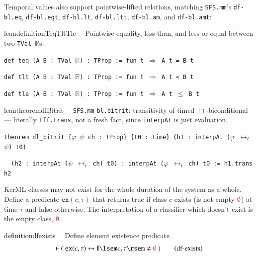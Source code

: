 \pn Temporal values also support pointwise-lifted relations, matching \texttt{SFS.mm}'s \texttt{df-bl.eq}, \texttt{df-bl.eqt}, \texttt{df-bl.lt}, 
\texttt{df-bl.ltt}, \texttt{df-bl.am}, and \texttt{df-bl.amt}:

\begin{restatable}{leandefinition}{TeqTltTle}~~ Pointwise equality, less-than, and less-or-equal between two \texttt{TVal $\mathbb{R}$}s.

\texttt{\textcolor{leancolor}{def} \textcolor{leanyellow}{teq} (A B : TVal $\mathbb{R}$) : TProp := \textcolor{leancolor}{fun} t $\Rightarrow$ A t = B t}

\texttt{\textcolor{leancolor}{def} \textcolor{leanyellow}{tlt} (A B : TVal $\mathbb{R}$) : TProp := \textcolor{leancolor}{fun} t $\Rightarrow$ A t < B t}

\texttt{\textcolor{leancolor}{def} \textcolor{leanyellow}{tle} (A B : TVal $\mathbb{R}$) : TProp := \textcolor{leancolor}{fun} t $\Rightarrow$ A t $\le$ B t}
\label{teq}
\label{tlt}
\label{tle}
\end{restatable}

\begin{restatable}{leantheorem}{dlBitrit}~~ \texttt{SFS.mm} \texttt{bl.bitrit}: transitivity of timed $\Box$-biconditional --- literally \texttt{Iff.trans}, not a fresh fact, since \texttt{interpAt} is just evaluation.

\texttt{\textcolor{leancolor}{theorem} \textcolor{leanyellow}{dl\_bitrit} \{$\varphi$ $\psi$ ch : TProp\} \{t0 : Time\} (h1 : interpAt ($\varphi$ $\leftrightarrow_t$ $\psi$) t0)}

\texttt{~~(h2 : interpAt ($\psi$ $\leftrightarrow_t$ ch) t0) : interpAt ($\varphi$ $\leftrightarrow_t$ ch) t0 := h1.trans h2}
\label{dl_bitrit}
\end{restatable}


\pn KerML classes may not exist for the whole duration of the system as a whole.  Define a predicate $\texttt{ex}(c,\tau)$ that returns true if class $c$ exists (is not empty $\emptyclass$) at time $\tau$ and false otherwise.
The interpretation of a classifier which doesn't exist is the empty class, $\emptyclass$.

\begin{restatable}{definition}{dfexists}~~ Define element existence predicate
\begin{align}
\vdash (~ \texttt{ex}(c,\tau) \leftrightarrow \mathbf{I}\lsem c,\tau\rsem\neq\emptyclass~)
\label{eq:df-exists}\tag{df-exists}
\end{align}
\end{restatable}

